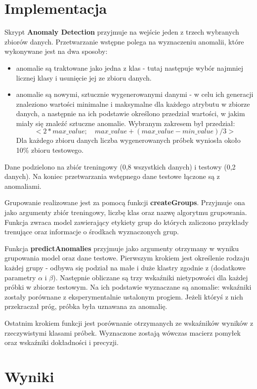 \documentclass[11pt,a4paper,twoside]{article}
\begin{document}
\section{Implementacja}
\label{Implementacja}
Skrypt \textbf{Anomaly Detection} przyjmuje na wejście jeden z trzech wybranych zbiorów danych. Przetwarzanie wstępne polega na  wyznaczeniu anomalii, które wykonywane jest na dwa sposoby:
\begin{itemize}
\item anomalie są traktowane jako jedna z klas - tutaj następuje wybór najmniej licznej klasy i usunięcie jej ze zbioru danych.
\item anomalie są nowymi, sztucznie wygenerowanymi danymi - w celu ich generacji znaleziono wartości minimalne i maksymalne dla każdego atrybutu w zbiorze danych, a następnie na ich podstawie określono przedział wartości, w jakim miały się znaleźć sztuczne anomalie. Wybranym zakresem był przedział: 
$$ <2*max\_value; \quad max\_value + (max\_value - min\_value)/3 >$$
Dla każdego zbioru danych liczba wygenerowanych próbek wyniosła około 10\% zbioru testowego.
\end{itemize}
Dane podzielono na zbiór treningowy (0,8 wszystkich danych) i testowy (0,2 danych). Na koniec przetwarzania wstępnego dane testowe łączone są z anomaliami.

Grupowanie realizowane jest za pomocą funkcji \textbf{createGroups}. Przyjmuje ona jako argumenty zbiór treningowy, liczbę klas oraz nazwę algorytmu grupowania. Funkcja zwraca model zawierający etykiety grup do których zaliczono przykłady trenujące oraz informacje o środkach wyznaczonych grup.

Funkcja \textbf{predictAnomalies} przyjmuje jako argumenty otrzymany w wyniku grupowania model oraz dane testowe. Pierwszym krokiem jest określenie rodzaju każdej grupy - odbywa się podział na małe i duże klastry zgodnie z \cite{LC} (dodatkowe parametry $\alpha$ i $\beta$). Następnie obliczane są trzy wskaźniki nietypowości dla każdej próbki w zbiorze testowym. Na ich podstawie wyznaczane są anomalie: wskaźniki zostały porównane z eksperymentalnie ustalonym progiem. Jeżeli któryś z nich przekraczał próg, próbka była uznawana za anomalię.

Ostatnim krokiem funkcji jest porównanie otrzymanych ze wskaźników wyników z rzeczywistymi klasami próbek. Wyznaczone zostają wówczas macierz pomyłek oraz wskaźniki dokładności i precyzji.


\section{Wyniki}
\end{document}

